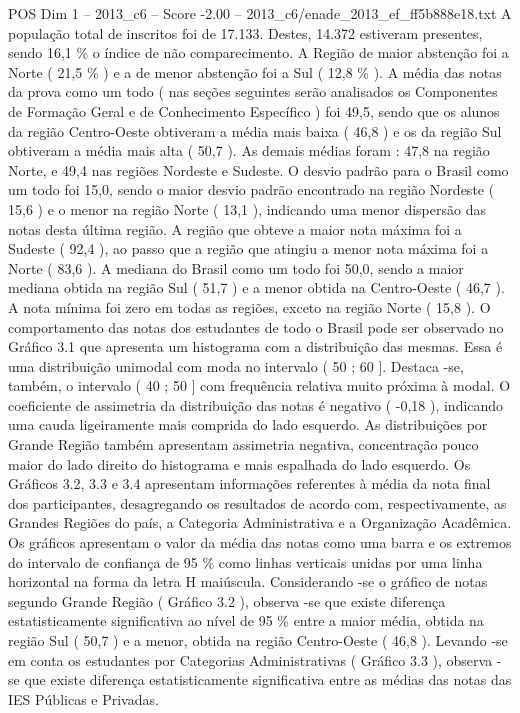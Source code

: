 \begin{textsample}{POS Dim 1 – 2013\_c6 – Score -2.00 – 2013\_c6/enade\_2013\_ef\_ff5b888e18.txt}
A população total de inscritos foi de 17.133.
Destes, 14.372 estiveram presentes, sendo 16,1 \% o índice de não comparecimento.
A Região de maior abstenção foi a Norte ( 21,5 \% ) e a de menor abstenção foi a Sul ( 12,8 \% ).
A média das notas da prova como um todo ( nas seções seguintes serão analisados os Componentes de Formação Geral e de Conhecimento Específico ) foi 49,5, sendo que os alunos da região Centro-Oeste obtiveram a média mais baixa ( 46,8 ) e os da região Sul obtiveram a média mais alta ( 50,7 ).
As demais médias foram : 47,8 na região Norte, e 49,4 nas regiões Nordeste e Sudeste.
O desvio padrão para o Brasil como um todo foi 15,0, sendo o maior desvio padrão encontrado na região Nordeste ( 15,6 ) e o menor na região Norte ( 13,1 ), indicando uma menor dispersão das notas desta última região.
A região que obteve a maior nota máxima foi a Sudeste ( 92,4 ), ao passo que a região que atingiu a menor nota máxima foi a Norte ( 83,6 ).
A mediana do Brasil como um todo foi 50,0, sendo a maior mediana obtida na região Sul ( 51,7 ) e a menor obtida na Centro-Oeste ( 46,7 ).
A nota mínima foi zero em todas as regiões, exceto na região Norte ( 15,8 ).
O comportamento das notas dos estudantes de todo o Brasil pode ser observado no Gráfico 3.1 que apresenta um histograma com a distribuição das mesmas.
Essa é uma distribuição unimodal com moda no intervalo ( 50 ; 60 ].
Destaca -se, também, o intervalo ( 40 ; 50 ] com frequência relativa muito próxima à modal.
O coeficiente de assimetria da distribuição das notas é negativo ( -0,18 ), indicando uma cauda ligeiramente mais comprida do lado esquerdo.
As distribuições por Grande Região também apresentam assimetria negativa, concentração pouco maior do lado direito do histograma e mais espalhada do lado esquerdo.
Os Gráficos 3.2, 3.3 e 3.4 apresentam informações referentes à média da nota final dos participantes, desagregando os resultados de acordo com, respectivamente, as Grandes Regiões do país, a Categoria Administrativa e a Organização Acadêmica.
Os gráficos apresentam o valor da média das notas como uma barra e os extremos do intervalo de confiança de 95 \% como linhas verticais unidas por uma linha horizontal na forma da letra H maiúscula.
Considerando -se o gráfico de notas segundo Grande Região ( Gráfico 3.2 ), observa -se que existe diferença estatisticamente significativa ao nível de 95 \% entre a maior média, obtida na região Sul ( 50,7 ) e a menor, obtida na região Centro-Oeste ( 46,8 ).
Levando -se em conta os estudantes por Categorias Administrativas ( Gráfico 3.3 ), observa -se que existe diferença estatisticamente significativa entre as médias das notas das IES Públicas e Privadas.

\end{textsample}
